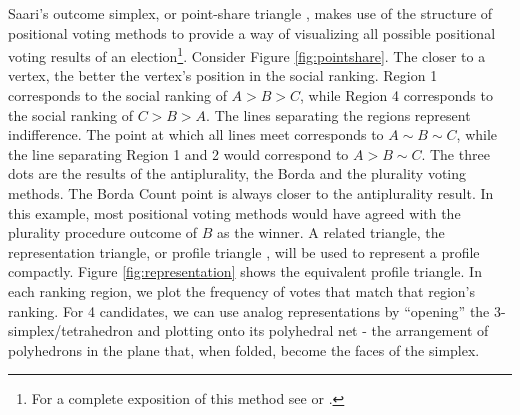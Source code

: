 \documentclass[hidelinks,11pt]{article} \usepackage[utf8]{inputenc}
\begin{document}

Saari's outcome simplex, or point-share triangle
\parencite{eggers20_diagr_analy_ordin_votin_system}, makes use of the structure
of positional voting methods to provide a way of visualizing all possible
positional voting results of an election\footnote{For a complete exposition of
  this method see \textcite{saari1995basic} or \textcite{nurmi2002voting}.}.
Consider Figure \ref{fig:pointshare}. The closer to a vertex, the better the
vertex's position in the social ranking. Region 1 corresponds to the social
ranking of \(A > B > C\), while Region 4 corresponds to the social ranking of
\(C>B>A\). The lines separating the regions represent indifference. The point at
which all lines meet corresponds to \(A \sim B \sim C\), while the line
separating Region 1 and 2 would correspond to \(A > B \sim C\). The three dots
are the results of the antiplurality, the Borda and the plurality voting
methods. The Borda Count point is always closer to the antiplurality result. In
this example, most positional voting methods would have agreed with the
plurality procedure outcome of \(B\) as the winner. A related triangle, the
representation triangle, or profile triangle
\parencite{eggers20_diagr_analy_ordin_votin_system}, will be used to represent a
profile compactly. Figure \ref{fig:representation} shows the equivalent profile
triangle. In each ranking region, we plot the frequency of votes that match that
region's ranking. For 4 candidates, we can use analog representations by
``opening'' the 3-simplex/tetrahedron and plotting onto its polyhedral net - the
arrangement of polyhedrons in the plane that, when folded, become the faces of
the simplex.
\end{document}

